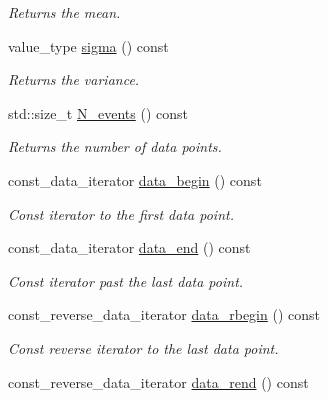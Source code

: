\begin{DoxyCompactItemize}
\begin{DoxyCompactList}\small\item\em Returns the mean. \end{DoxyCompactList}\item 
\hypertarget{a00280_ac3cba0f0df4b82262ce92381895c8879}{value\-\_\-type \hyperlink{a00280_ac3cba0f0df4b82262ce92381895c8879}{sigma} () const }\label{a00280_ac3cba0f0df4b82262ce92381895c8879}

\begin{DoxyCompactList}\small\item\em Returns the variance. \end{DoxyCompactList}\item 
\hypertarget{a00280_ab4c1f9ec5a51b4973c1522382ee9e558}{std\-::size\-\_\-t \hyperlink{a00280_ab4c1f9ec5a51b4973c1522382ee9e558}{N\-\_\-events} () const }\label{a00280_ab4c1f9ec5a51b4973c1522382ee9e558}

\begin{DoxyCompactList}\small\item\em Returns the number of data points. \end{DoxyCompactList}\item 
\hypertarget{a00280_a8430fe1342b11c173c53f1e7c4c4c928}{const\-\_\-data\-\_\-iterator \hyperlink{a00280_a8430fe1342b11c173c53f1e7c4c4c928}{data\-\_\-begin} () const }\label{a00280_a8430fe1342b11c173c53f1e7c4c4c928}

\begin{DoxyCompactList}\small\item\em Const iterator to the first data point. \end{DoxyCompactList}\item 
\hypertarget{a00280_a297ca8e89ce33201bb6531ded246b891}{const\-\_\-data\-\_\-iterator \hyperlink{a00280_a297ca8e89ce33201bb6531ded246b891}{data\-\_\-end} () const }\label{a00280_a297ca8e89ce33201bb6531ded246b891}

\begin{DoxyCompactList}\small\item\em Const iterator past the last data point. \end{DoxyCompactList}\item 
\hypertarget{a00280_a40d0017be4fd229d7ade1b6b6ff65286}{const\-\_\-reverse\-\_\-data\-\_\-iterator \hyperlink{a00280_a40d0017be4fd229d7ade1b6b6ff65286}{data\-\_\-rbegin} () const }\label{a00280_a40d0017be4fd229d7ade1b6b6ff65286}

\begin{DoxyCompactList}\small\item\em Const reverse iterator to the last data point. \end{DoxyCompactList}\item 
\hypertarget{a00280_ad3ba48fe67c2225ae2b134884029b55c}{const\-\_\-reverse\-\_\-data\-\_\-iterator \hyperlink{a00280_ad3ba48fe67c2225ae2b134884029b55c}{data\-\_\-rend} () const }\label{a00280_ad3ba48fe67c2225ae2b134884029b55c}


\end{DoxyCompactItemize}
